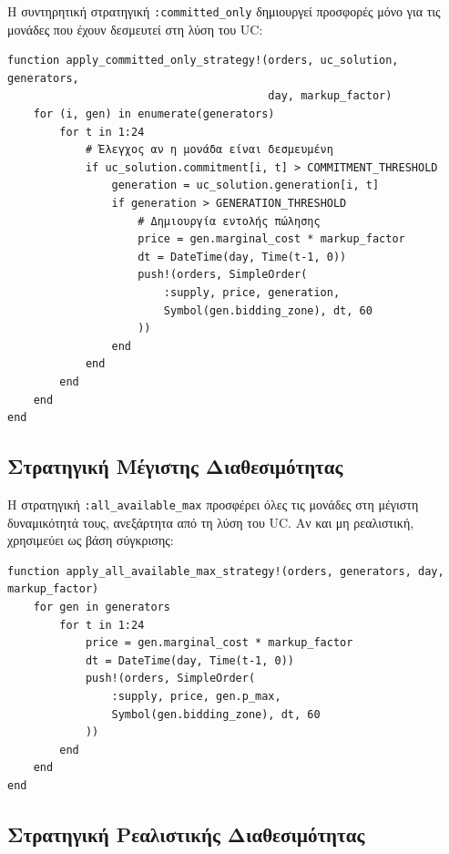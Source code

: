 Η συντηρητική στρατηγική \texttt{:committed\_only} δημιουργεί προσφορές μόνο για τις μονάδες που έχουν δεσμευτεί στη λύση του UC:

\begin{samepage}
\begin{verbatim}
function apply_committed_only_strategy!(orders, uc_solution, generators, 
                                        day, markup_factor)
    for (i, gen) in enumerate(generators)
        for t in 1:24
            # Έλεγχος αν η μονάδα είναι δεσμευμένη
            if uc_solution.commitment[i, t] > COMMITMENT_THRESHOLD
                generation = uc_solution.generation[i, t]
                if generation > GENERATION_THRESHOLD
                    # Δημιουργία εντολής πώλησης
                    price = gen.marginal_cost * markup_factor
                    dt = DateTime(day, Time(t-1, 0))
                    push!(orders, SimpleOrder(
                        :supply, price, generation, 
                        Symbol(gen.bidding_zone), dt, 60
                    ))
                end
            end
        end
    end
end
\end{verbatim}
\end{samepage}

\subsection{Στρατηγική Μέγιστης Διαθεσιμότητας}
\label{subsec:all-available-max}

Η στρατηγική \texttt{:all\_available\_max} προσφέρει όλες τις μονάδες στη μέγιστη δυναμικότητά τους, ανεξάρτητα από τη λύση του UC. Αν και μη ρεαλιστική, χρησιμεύει ως βάση σύγκρισης:

\begin{samepage}
\begin{verbatim}
function apply_all_available_max_strategy!(orders, generators, day, markup_factor)
    for gen in generators
        for t in 1:24
            price = gen.marginal_cost * markup_factor
            dt = DateTime(day, Time(t-1, 0))
            push!(orders, SimpleOrder(
                :supply, price, gen.p_max,
                Symbol(gen.bidding_zone), dt, 60
            ))
        end
    end
end
\end{verbatim}
\end{samepage}

\subsection{Στρατηγική Ρεαλιστικής Διαθεσιμότητας}
\label{subsec:all-available-realistic}


